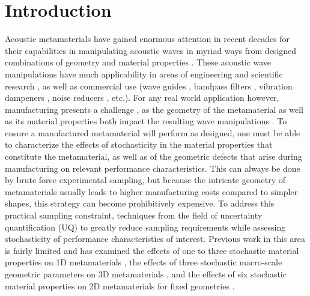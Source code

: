 \documentclass[preprint,review,12pt]{elsarticle}
\begin{document}
\section{Introduction}
\label{introduction}
Acoustic metamaterials have gained enormous attention in recent decades for their capabilities in manipulating acoustic waves in myriad ways from designed combinations of geometry and material properties \citep{review2020, sal2023sound}. These acoustic wave manipulations have much applicability in areas of engineering and scientific research \cite{liao2021acoustic}, as well as commercial use (wave guides \cite{CHEN2024108978, liu2020acoustic, zangeneh2018acoustic}, bandpass filters \cite{xinjing2019acoustic, strikwerda2014metamaterial}, vibration dampeners \cite{nakayama2023acoustic, sun2017experimental}, noise reducers \cite{gao2022acoustic}, etc.). For any real world application however, manufacturing presents a challenge \cite{askari2020additive}, as the geometry of the metamaterial as well as its material properties both impact the resulting wave manipulations \cite{gardiner2021additive}. To ensure a manufactured metamaterial will perform as designed, one must be able to characterize the effects of stochasticity in the material properties that constitute the metamaterial, as well as of the geometric defects that arise during manufacturing on relevant performance characteristics. This can always be done by brute force experimental sampling, but because the intricate geometry of metamaterials usually leads to higher manufacturing costs compared to simpler shapes, this strategy can become prohibitively expensive. To address this practical sampling constraint, techniques from the field of uncertainty quantification (UQ) to greatly reduce sampling requirements \cite{shields2015refined, zhang2021modern} while assessing stochasticity of performance characteristics of interest. Previous work in this area is fairly limited and has examined the effects of one to three stochastic material properties on 1D metamaterials \cite{nandi2020uncertainty}, the effects of three stochastic macro-scale geometric parameters on 3D metamaterials \cite{henneberg2020periodically}, and the effects of six stochastic material properties on 2D metamaterials for fixed geometries 
\cite{he2018uncertainty}.
\end{document}
